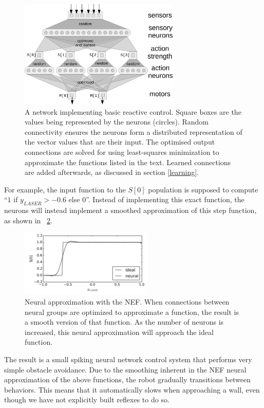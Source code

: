 \documentclass[conference]{IEEEtran}
\begin{document}
\begin{figure}[!t]
\centering
\includegraphics[width=3in]{network.png}
\caption{A network implementing basic reactive control. Square boxes are the
values being represented by the neurons (circles).  Random connectivity
ensures the neurons form a distributed representation of the vector values
that are their input.  The optimised output connections are solved for
using least-squares minimization to approximate the functions listed in
the text.  Learned connections are added afterwards, as discussed in 
section \ref{learning}.}
\label{Flow}
\end{figure}

For example, the input function to 
the $S[0]$ population is supposed to compute ``$1$ if $y_{LASER} > -0.6$ else $0$''. 
Instead of implementing this exact function, the neurons will instead implement
a smoothed approximation of this step function, as shown in
\figurename~\ref{NEF}.

\begin{figure}[!t]
\centering
\includegraphics[width=2.5in]{smoothing.png}
\caption{Neural approximation with the NEF. When connections between neural groups are optimized to approximate a function, the result is a smooth version of that function. As the number of neurons is increased, this neural approximation will approach the ideal function.}
\label{NEF}
\end{figure}

The result is a small spiking neural network control system that performs very 
simple obstacle avoidance. Due to the smoothing inherent in the NEF neural 
approximation of the above functions, the robot gradually transitions between 
behaviors. This means that it automatically slows when approaching a wall, 
even though we have not explicitly built reflexes to do so.  
\end{document}
